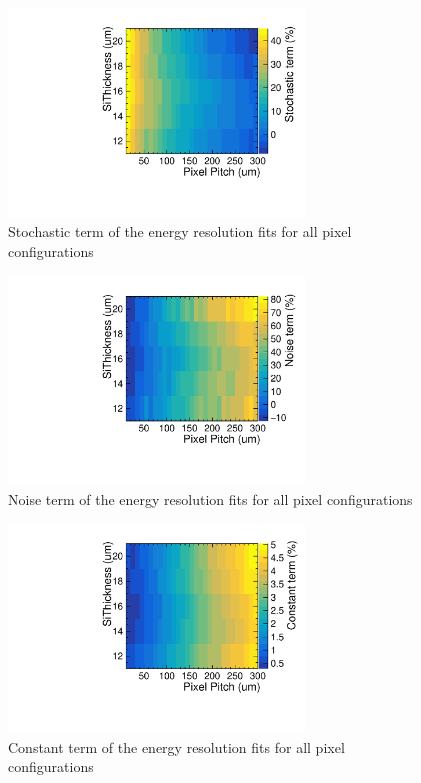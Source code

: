 \begin{figure}
  \centering
  \includegraphics[width=0.7\textwidth,keepaspectratio]{DECALStudies/fig/2DRawStochastic.pdf}
  \caption{Stochastic term of the energy resolution fits for all pixel configurations}
  \label{fig:stochasticterm}
\end{figure}
\begin{figure}
  \centering
  \includegraphics[width=0.7\textwidth,keepaspectratio]{DECALStudies/fig/2DRawNoise.pdf}
  \caption{Noise term of the energy resolution fits for all pixel configurations}
  \label{fig:noiseterm}
\end{figure}
\begin{figure}
  \centering
  \includegraphics[width=0.7\textwidth,keepaspectratio]{DECALStudies/fig/2DRawConstant.pdf}
  \caption{Constant term of the energy resolution fits for all pixel configurations}
  \label{fig:constantterm}
\end{figure}

